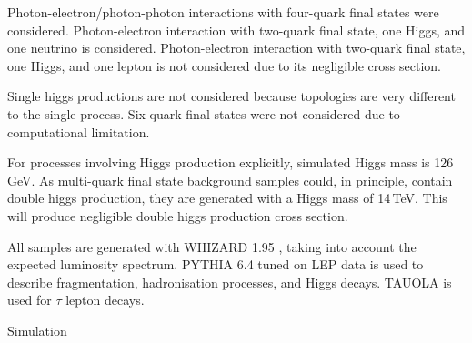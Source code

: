 Photon-electron/photon-photon interactions with four-quark final states were considered. Photon-electron interaction with two-quark final state, one Higgs, and one neutrino is considered. Photon-electron interaction with two-quark final state, one Higgs, and one lepton is not considered due to its negligible cross section.


Single higgs productions are not considered because topologies are very different to the single process.
Six-quark final states were not considered due to computational limitation.

For processes involving Higgs production explicitly, simulated Higgs mass is 126\,GeV.
As multi-quark final state background samples could, in principle, contain double higgs production, they are generated with a Higgs mass of 14\,TeV. This will produce negligible double higgs production cross section.






All samples are generated with WHIZARD 1.95 \cite{}, taking into account the expected \CLIC luminosity spectrum.
PYTHIA 6.4 \cite{} tuned on LEP data \cite{} is used to describe fragmentation, hadronisation processes, and Higgs decays. TAUOLA \cite{} is used for $\tau$ lepton decays.

Simulation

